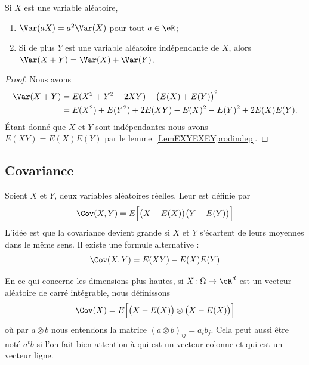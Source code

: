 \begin{lemma}       \label{LemEXYEXEYindep}
	Si \( X\) est une variable aléatoire,
	\begin{enumerate}
		\item
		      \( \Var(aX)=a^2\Var(X)\) pour tout \( a\in\eR\);
		\item
		      Si de plus \( Y\) est une variable aléatoire indépendante de \( X\), alors \( \Var(X+Y)=\Var(X)+\Var(Y)\).
	\end{enumerate}
\end{lemma}

\begin{proof}
	Nous avons
	\begin{subequations}
		\begin{align}
			\Var(X+Y) & =E(X^2+Y^2+2XY)-\big( E(X)+E(Y) \big)^2        \\
			          & =E(X^2)+E(Y^2)+2E(XY)-E(X)^2-E(Y)^2+2E(X)E(Y).
		\end{align}
	\end{subequations}
	Étant donné que \( X\) et \( Y\) sont indépendantes nous avons \( E(XY)=E(X)E(Y)\) par le lemme~\ref{LemEXYEXEYprodindep}.
\end{proof}


\subsection{Covariance}

Soient \( X\) et \( Y\), deux variables aléatoires réelles. Leur  est définie par
\begin{equation}    \label{EqHUWtttN}
	\Cov(X,Y)=E\Big[ \big( X-E(X) \big)\big( Y-E(Y) \big) \Big]
\end{equation}
L'idée est que la covariance devient grande si \( X\) et \( Y\) s'écartent de leurs moyennes dans le même sens. Il existe une formule alternative :
\begin{equation}
	\Cov(X,Y)=E(XY)-E(X)E(Y)
\end{equation}

En ce qui concerne les dimensions plus hautes, si \( X\colon \Omega\to \eR^d\) est un vecteur aléatoire de carré intégrable, nous définissons
\begin{equation}    \label{EqZlvLWx}
	\Cov(X)=E\Big[ \big(  X-E(X) \big)\otimes\big( X-E(X)\big) \Big]
\end{equation}
où par \( a\otimes b\) nous entendons la matrice \( (a\otimes b)_{ij}=a_ib_j\). Cela peut aussi être noté \( a^tb\) si l'on fait bien attention à qui est un vecteur colonne et qui est un vecteur ligne.

